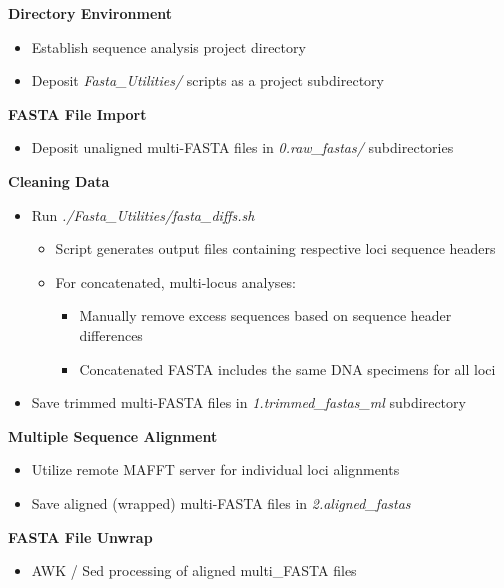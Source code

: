 \begin{seqlist}
\item{\textbf{Directory Environment}}
\begin{itemize}
\item{Establish sequence analysis project directory}
\item{Deposit \textit{Fasta\_Utilities/} scripts as a project subdirectory}
\end{itemize}

\item{\textbf{FASTA File Import}}
\begin{itemize}
\item{Deposit unaligned multi-FASTA files in \textit{0.raw\_fastas/} subdirectories}
\end{itemize}

\item{\textbf{Cleaning Data}}
\begin{itemize}
\item{Run \textit{./Fasta\_Utilities/fasta\_diffs.sh}}
\begin{itemize}
\item{Script generates output files containing respective loci sequence headers}
\end{itemize}
\begin{itemize}
\item{For concatenated, multi-locus analyses:}
\begin{itemize}
\item{Manually remove excess sequences based on sequence header differences}
\item{Concatenated FASTA includes the same DNA specimens for all loci}
\end{itemize}
\end{itemize}
\item{Save trimmed multi-FASTA files in \textit{1.trimmed\_fastas\_ml} subdirectory}
\end{itemize}

\item{\textbf{Multiple Sequence Alignment}}
\begin{itemize}
\item{Utilize remote MAFFT server for individual loci alignments}
\item{Save aligned (wrapped) multi-FASTA files in \textit{2.aligned\_fastas}}
\end{itemize}

\item{\textbf{FASTA File Unwrap}}
\begin{itemize}
\item{AWK / Sed processing of aligned multi\_FASTA files}
\end{itemize}


\end{seqlist}
